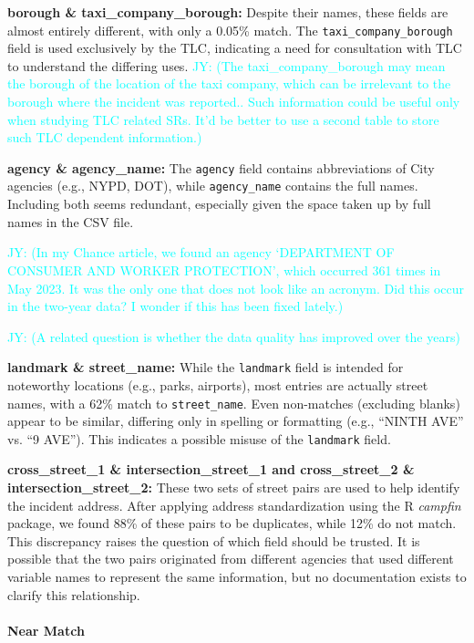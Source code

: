 \documentclass[linenumber]{jdsart}
\newcommand{\jy}[1]{\textcolor{cyan}{JY: (#1)}}
\begin{document}
\textbf{borough \& taxi\_company\_borough:} Despite their names, these 
fields are almost entirely different, with only a 0.05\% match. The 
\texttt{taxi\_company\_borough} field is used exclusively by the TLC, 
indicating a need for consultation with TLC to understand the differing 
uses.
\jy{The taxi\_company\_borough may mean the borough of the location of
  the taxi company, which can be irrelevant to the borough where the
  incident was reported.. Such information could be useful only when
  studying TLC related SRs. It'd be better to use a second table to
  store such TLC dependent information.}

\textbf{agency \& agency\_name:} The \texttt{agency} field contains 
abbreviations of City agencies (e.g., NYPD, DOT), while 
\texttt{agency\_name} contains the full names. Including both seems 
redundant, especially given the space taken up by full names in the 
CSV file.

\jy{In my Chance article, we found an agency
  `DEPARTMENT OF CONSUMER AND WORKER PROTECTION', which occurred 361
  times in May 2023. It was the only one that does not look like an
  acronym. Did this occur in the two-year data?
  I wonder if this has been fixed lately.}

\jy{A related question is whether the data quality has improved over
  the years}
  

\textbf{landmark \& street\_name:} While the \texttt{landmark} field is 
intended for noteworthy locations (e.g., parks, airports), most entries 
are actually street names, with a 62\% match to \texttt{street\_name}. 
Even non-matches (excluding blanks) appear to be similar, differing 
only in spelling or formatting (e.g., ``NINTH AVE'' vs. ``9 AVE''). This 
indicates a possible misuse of the \texttt{landmark} field.

\textbf{cross\_street\_1 \& intersection\_street\_1 and cross\_street\_2 
\& intersection\_street\_2:} These two sets of street pairs are used to 
help identify the incident address. After applying address 
standardization using the R \textit{campfin} package, we found 88\% of 
these pairs to be duplicates, while 12\% do not match. This discrepancy 
raises the question of which field should be trusted. It is possible 
that the two pairs originated from different agencies that used 
different variable names to represent the same information, but no 
documentation exists to clarify this relationship.

\paragraph{Near Match}
\end{document}
